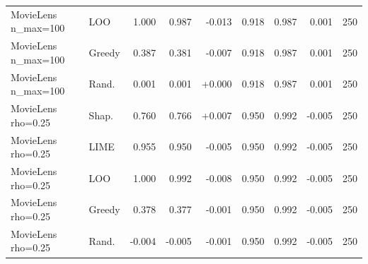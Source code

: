 \begin{table}[H]
\begin{tabular}{@{}llrrrrrrr@{}}
MovieLens n\_max=100 & LOO & 1.000 & 0.987 & -0.013 & 0.918 & 0.987 & 0.001 & 250 \\
MovieLens n\_max=100 & Greedy & 0.387 & 0.381 & -0.007 & 0.918 & 0.987 & 0.001 & 250 \\
MovieLens n\_max=100 & Rand. & 0.001 & 0.001 & +0.000 & 0.918 & 0.987 & 0.001 & 250 \\
MovieLens rho=0.25 & Shap. & 0.760 & 0.766 & +0.007 & 0.950 & 0.992 & -0.005 & 250 \\
MovieLens rho=0.25 & LIME & 0.955 & 0.950 & -0.005 & 0.950 & 0.992 & -0.005 & 250 \\
MovieLens rho=0.25 & LOO & 1.000 & 0.992 & -0.008 & 0.950 & 0.992 & -0.005 & 250 \\
MovieLens rho=0.25 & Greedy & 0.378 & 0.377 & -0.001 & 0.950 & 0.992 & -0.005 & 250 \\
MovieLens rho=0.25 & Rand. & -0.004 & -0.005 & -0.001 & 0.950 & 0.992 & -0.005 & 250 \\
\bottomrule
\end{tabular}
\end{table}
